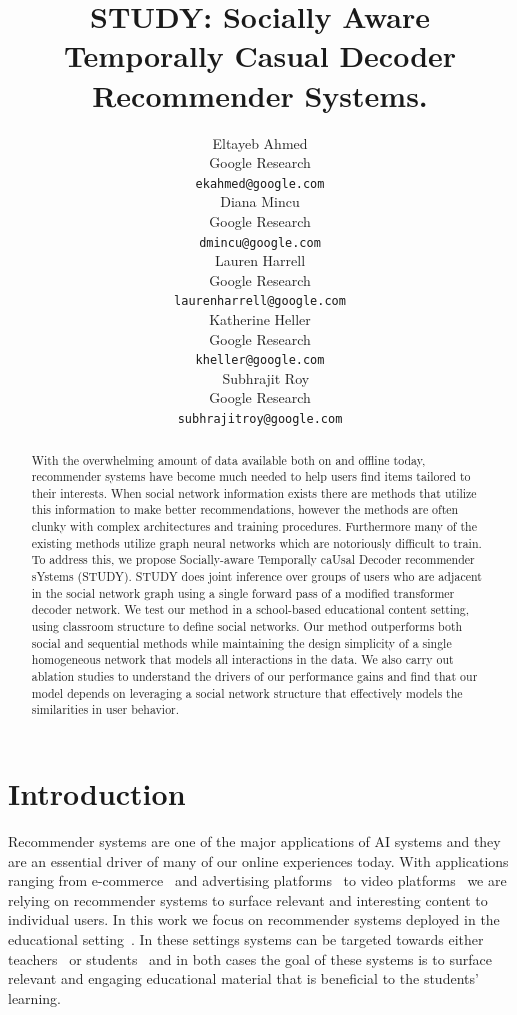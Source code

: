 \documentclass{article}
\title{STUDY: Socially Aware Temporally Casual Decoder Recommender Systems. }
\author{%
 Eltayeb Ahmed \\
  Google Research\\
  \texttt{ekahmed@google.com} \\
\And
  Diana Mincu \\
  Google Research \\
  \texttt{dmincu@google.com} \\
\And
  Lauren Harrell\\
  Google Research \\
  \texttt{laurenharrell@google.com} \\
\And
  Katherine Heller \\
  Google Research \\
  \texttt{kheller@google.com} \\
\
\And
    Subhrajit Roy \\
  Google Research \\
  \texttt{subhrajitroy@google.com} \\
}
\begin{document}
\maketitle
\begin{abstract}
With the overwhelming amount of data available both on and offline today, recommender systems have become much needed to help users find items tailored to their interests. 
When social network information exists there are methods that utilize this information to make better recommendations, however the methods are often clunky with complex architectures and training procedures. Furthermore many of the existing methods utilize graph neural networks which are notoriously difficult to train. To address this, we propose Socially-aware Temporally caUsal Decoder recommender sYstems (STUDY). STUDY does joint inference over groups of users who are adjacent in the social network graph using a single forward pass of a modified transformer decoder network. We test our method in a school-based educational content setting, using classroom structure to define social networks.  Our method outperforms both social and sequential methods while maintaining the design simplicity of a single homogeneous network that models all interactions in the data. We also carry out ablation studies to understand the drivers of our performance gains and find that our model depends on leveraging a social network structure that effectively models the similarities in user behavior.

\end{abstract}

\section{Introduction}
Recommender systems are one of the major applications of AI systems and they are an essential driver of many of our online experiences today. With applications ranging from e-commerce~\cite{Li2020HierarchicalBG} and advertising platforms~\cite{liu2021neural} to video platforms~\cite{Deldjoo2020} we are relying on recommender systems to surface relevant and interesting content to individual users. 
In this work we focus on recommender systems deployed in the educational setting~\cite{abdi2020complementing}. In these settings systems can be targeted towards either teachers~\cite{dhahri2021review} or students~\cite{bodily2017review} and in both cases the goal of these systems is to surface relevant and engaging educational material that is beneficial to the students' learning.
\end{document}
